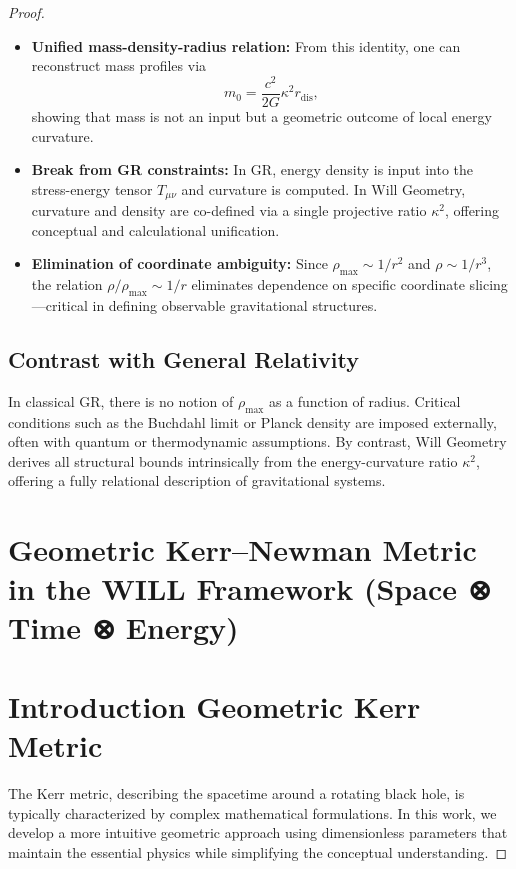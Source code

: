 \documentclass{article}
\begin{document}
\begin{theorem}
\begin{proof}
\begin{itemize}
  \item \textbf{Unified mass-density-radius relation:} From this identity, one can reconstruct mass profiles via
  \[
  m_0 = \frac{c^2}{2G} \kappa^2 r_{\text{dis}},
  \]
  showing that mass is not an input but a geometric outcome of local energy curvature.

  \item \textbf{Break from GR constraints:} In GR, energy density is input into the stress-energy tensor \( T_{\mu\nu} \) and curvature is computed. In Will Geometry, curvature and density are co-defined via a single projective ratio \( \kappa^2 \), offering conceptual and calculational unification.

  \item \textbf{Elimination of coordinate ambiguity:} Since \( \rho_{\text{max}} \sim 1/r^2 \) and \( \rho \sim 1/r^3 \), the relation \( \rho/\rho_{\text{max}} \sim 1/r \) eliminates dependence on specific coordinate slicing—critical in defining observable gravitational structures.
\end{itemize}

\subsection*{Contrast with General Relativity}

In classical GR, there is no notion of \( \rho_{\text{max}} \) as a function of radius. Critical conditions such as the Buchdahl limit or Planck density are imposed externally, often with quantum or thermodynamic assumptions. By contrast, Will Geometry derives all structural bounds intrinsically from the energy-curvature ratio \( \kappa^2 \), offering a fully relational description of gravitational systems.

\section{Geometric Kerr–Newman Metric in the WILL Framework  (Space ⊗ Time ⊗ Energy)}

\section{Introduction Geometric Kerr Metric}
The Kerr metric, describing the spacetime around a rotating black hole, is typically characterized by complex mathematical formulations. In this work, we develop a more intuitive geometric approach using dimensionless parameters that maintain the essential physics while simplifying the conceptual understanding.


\end{proof}
\end{theorem}
\end{document}
